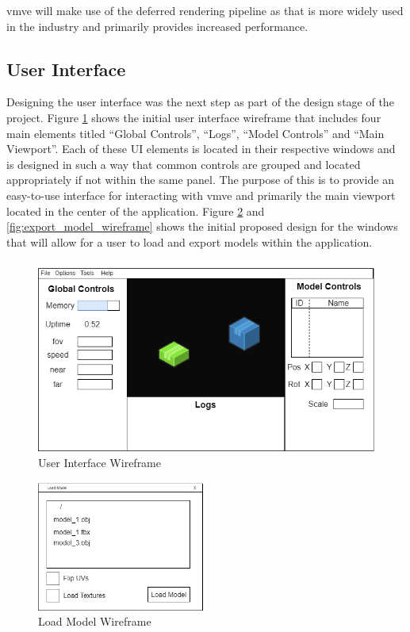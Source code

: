 \documentclass[11pt]{article}
\begin{document}
\gls*{vmve} will make use of the deferred rendering pipeline as that is more
widely used in the industry and primarily provides increased performance.

\subsection{User Interface}
Designing the user interface was the next step as part of the design stage of
the project. Figure \ref{fig:ui_design} shows the initial user interface
wireframe that includes four main elements titled ``Global Controls'', ``Logs'',
``Model Controls'' and ``Main Viewport''. Each of these UI elements is located
in their respective windows and is designed in such a way that common controls
are grouped and located appropriately if not within the same panel. The purpose
of this is to provide an easy-to-use interface for interacting with \gls*{vmve}
and primarily the main viewport located in the center of the application. Figure
\ref{fig:load_model_wireframe} and \ref{fig:export_model_wireframe} shows the
initial proposed design for the windows that will allow for a user to load and
export models within the application.

\begin{figure}[H]
  \centering
  \includegraphics[width=\textwidth]{images/ui_design.png}
  \caption{User Interface Wireframe}
  \label{fig:ui_design}
\end{figure}

\begin{figure}[H]
  \centering
  \includegraphics[width=0.5\textwidth]{images/load_model_wireframe.png}
  \caption{Load Model Wireframe}
  \label{fig:load_model_wireframe}
\end{figure}
\end{document}
